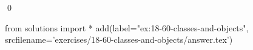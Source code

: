 
\begin{ex}
  \label{ex:18-60-classes-and-objects}
  
  \qed
\end{ex}
\begin{python0}
from solutions import *
add(label="ex:18-60-classes-and-objects",
    srcfilename='exercises/18-60-classes-and-objects/answer.tex')
\end{python0}

